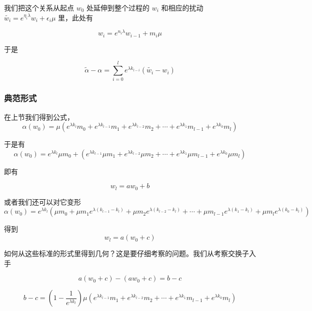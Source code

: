 \documentclass[a4paper,12pt]{article}
\numberwithin{definition}{section}
\numberwithin{lemma}{section}
\numberwithin{proposition}{section}
\numberwithin{theorem}{section}
\numberwithin{grammar}{section}
\numberwithin{program}{section}
\numberwithin{convention}{section}
\numberwithin{corollary}{section}
\begin{document}
我们把这个关系从起点 $w_0$ 处延伸到整个过程的 $w_i$ 和相应的扰动 $\tilde{w_i} = e^{\eta_i \lambda} w_i + \epsilon_i \mu$ 里，此处有

$$
w_i = e^{n_i \lambda} w_{i-1} + m_i \mu
$$

于是

\begin{equation}
\tilde{\alpha} - \alpha = \sum_{i=0}^l e^{\lambda k_{l - i}} (\tilde{w_i} - w_i)
\end{equation}

\subsubsection{典范形式}

在上节我们得到公式，
\begin{equation}
\alpha(w_0) = \mu (e^{\lambda k_l} m_0 + e^{\lambda k_{l - 1}} m_1  + e^{\lambda k_{l - 2}} m_2 + \cdots + e^{\lambda k_1} m_{l-1} + e^{\lambda k_0} m_l)
\end{equation}

于是有
\begin{equation}
\alpha(w_0) = e^{\lambda k_l} \mu m_0 + (e^{\lambda k_{l - 1}} \mu m_1  + e^{\lambda k_{l - 2}} \mu m_2 + \cdots + e^{\lambda k_1} \mu m_{l-1} + e^{\lambda k_0} \mu m_l)
\end{equation}

即有

\begin{equation}
w_l = a w_0 + b
\end{equation}

或者我们还可以对它变形
\begin{equation}
\alpha(w_0) = e^{\lambda k_l} (\mu m_0 + \mu m_1 e^{\lambda (k_{l - 1} - k_l)} + \mu m_2 e^{\lambda (k_{l - 2} - k_l)}+ \cdots + \mu m_{l-1} e^{\lambda (k_1 - k_l)}  + \mu m_l e^{\lambda (k_0 - k_l)})
\end{equation}

得到
\begin{equation}
w_l = a (w_0 + c)
\end{equation}

如何从这些标准的形式里得到几何？这是要仔细考察的问题。我们从考察交换子入手

\begin{equation}
a (w_0 + c) - (a w_0 + c) = b - c
\end{equation}

\begin{equation}
b - c = (1 - \frac{1}{e^{\lambda k_l}}) \mu (e^{\lambda k_{l - 1}} m_1  + e^{\lambda k_{l - 2}} m_2 + \cdots + e^{\lambda k_1} m_{l-1} + e^{\lambda k_0} m_l)
\end{equation}
\end{document}
